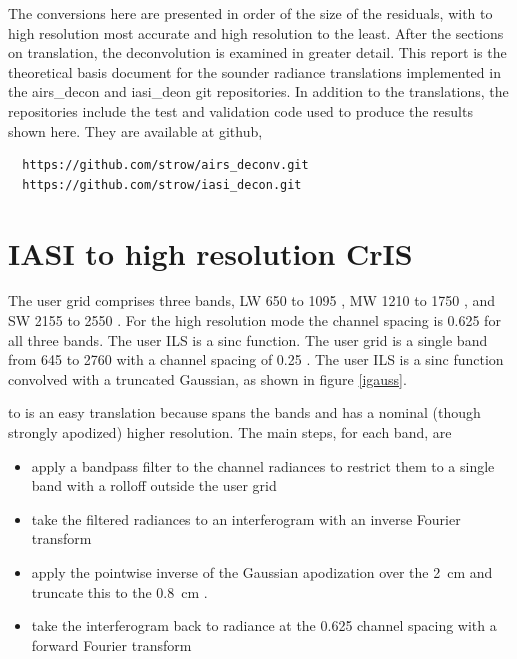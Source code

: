 \documentclass[12pt]{article}
\begin{document}
The conversions here are presented in order of the size of the
residuals, with {\iasi} to high resolution {\cris} most accurate and
high resolution {\cris} to {\airs} the least.  After the sections on
translation, the {\airs} deconvolution is examined in greater
detail.  This report is the theoretical basis document for the
sounder radiance translations implemented in the airs\_decon and
iasi\_deon git repositories.  In addition to the translations, the
repositories include the test and validation code used to produce
the results shown here.  They are available at github,
\begin{verbatim}
  https://github.com/strow/airs_deconv.git
  https://github.com/strow/iasi_decon.git
\end{verbatim}


\section{IASI to high resolution CrIS}

The {\cris} user grid comprises three bands, LW 650 to 1095 {\wn},
MW 1210 to 1750 {\wn}, and SW 2155 to 2550 {\wn}.  For the {\cris}
high resolution mode the channel spacing is 0.625 {\wn} for all
three bands.  The {\cris} user ILS is a sinc function.  The {\iasi}
user grid is a single band from 645 to 2760 {\wn} with a channel
spacing of 0.25 {\wn}.  The {\iasi} user ILS is a sinc function
convolved with a truncated Gaussian, as shown in figure \ref{igauss}.

{\iasi} to {\cris} is an easy translation because {\iasi} spans the
{\cris} bands and has a nominal (though strongly apodized) higher
resolution.  The main steps, for each {\cris} band, are

\begin{itemize}

  \item apply a bandpass filter to the {\iasi} channel radiances to
    restrict them to a single {\cris} band with a rolloff outside the
    {\cris} user grid

  \item take the filtered radiances to an interferogram with an
    inverse Fourier transform

  \item apply the pointwise inverse of the {\iasi} Gaussian
    apodization over the {\iasi} 2~cm {\opd} and truncate this to
    the 0.8~cm {\cris} {\opd}.

  \item take the interferogram back to radiance at the {\cris}
    0.625 {\wn} channel spacing with a forward Fourier transform

\end{itemize}
\end{document}
